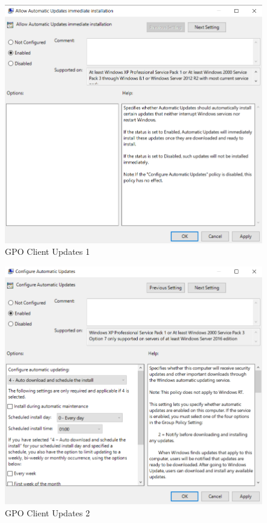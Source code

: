\begin{minipage}{0.5\linewidth}
    \begin{figure}[H]
        \centering
        \includegraphics[width=\linewidth]{../img/Updates/client-allow-immediate-updates.png}
        \caption{GPO Client Updates 1}
    \end{figure}
\end{minipage}
\begin{minipage}{0.5\linewidth}
    \begin{figure}[H]
        \centering
        \includegraphics[width=\linewidth]{../img/Updates/server-configure-automatic-updates.png}
        \caption{GPO Client Updates 2}
    \end{figure}
\end{minipage}\\
